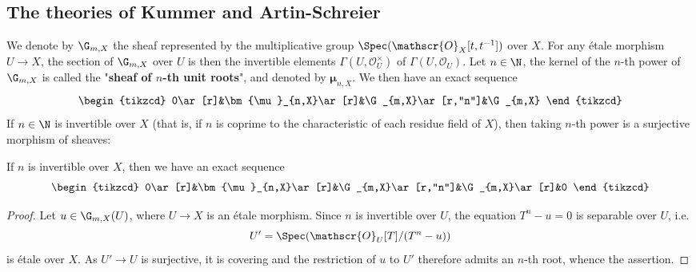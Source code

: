 \subsection{The theories of Kummer and Artin-Schreier}
We denote by $\G_{m,X}$ the sheaf represented by the multiplicative group $\Spec(\mathscr{O}_X[t,t^{-1}])$ over $X$. For any \'etale morphism $U\to X$, the section of $\G_{m,X}$ over $U$ is then the invertible elements $\Gamma(U,\mathscr{O}_U^\times)$ of $\Gamma(U,\mathscr{O}_U)$. Let $n\in\N$, the kernel of the $n$-th power of $\G_{m,X}$ is called the "\textbf{sheaf of $n$-th unit roots}", and denoted by $\bm{\mu}_{n,X}$. We then have an exact sequence
\begin{equation}\label{scheme etale Kummer exact sequence-1}
\begin{tikzcd}
0\ar[r]&\bm{\mu}_{n,X}\ar[r]&\G_{m,X}\ar[r,"n"]&\G_{m,X}  
\end{tikzcd}
\end{equation}
If $n\in\N$ is invertible over $X$ (that is, if $n$ is coprime to the characteristic of each residue field of $X$), then taking $n$-th power is a surjective morphism of sheaves:

\begin{theorem}\label{scheme etale Kummer exact sequence}
If $n$ is invertible over $X$, then we have an exact sequence
\begin{equation}\label{scheme etale Kummer exact sequence-2}
\begin{tikzcd}
0\ar[r]&\bm{\mu}_{n,X}\ar[r]&\G_{m,X}\ar[r,"n"]&\G_{m,X}\ar[r]&0
\end{tikzcd}
\end{equation}
\end{theorem}
\begin{proof}
Let $u\in\G_{m,X}(U)$, where $U\to X$ is an \'etale morphism. Since $n$ is invertible over $U$, the equation $T^n-u=0$ is separable over $U$, i.e.
\[U'=\Spec(\mathscr{O}_U[T]/(T^n-u))\]
is \'etale over $X$. As $U'\to U$ is surjective, it is covering and the restriction of $u$ to $U'$ therefore admits an $n$-th root, whence the assertion.
\end{proof}

